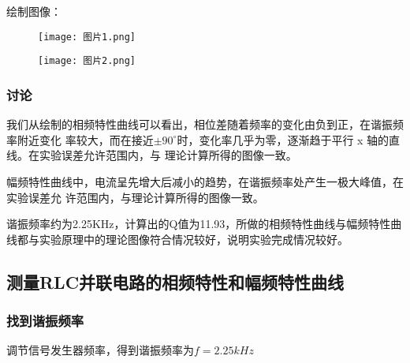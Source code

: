 \documentclass[11pt,a4paper]{article}
\begin{document}
    绘制图像：
    \begin{figure}[H]
        \centering
        \texttt{[image: 图片1.png]}
    \end{figure}
    \begin{figure}[H]
        \centering
        \texttt{[image: 图片2.png]}
    \end{figure}

    \subsubsection{讨论}
        我们从绘制的相频特性曲线可以看出，相位差随着频率的变化由负到正，在谐振频率附近变化
    率较大，而在接近$\pm90^{\circ}$时，变化率几乎为零，逐渐趋于平行 x 轴的直线。在实验误差允许范围内，与
    理论计算所得的图像一致。

        幅频特性曲线中，电流呈先增大后减小的趋势，在谐振频率处产生一极大峰值，在实验误差允
    许范围内，与理论计算所得的图像一致。

    谐振频率约为2.25KHz，计算出的Q值为11.93，所做的相频特性曲线与幅频特性曲线都与实验原理中的理论图像符合情况较好，说明实验完成情况较好。
        

    \subsection{测量RLC并联电路的相频特性和幅频特性曲线}
    \subsubsection{找到谐振频率}
    调节信号发生器频率，得到谐振频率为$f=2.25kHz$
\end{document}
